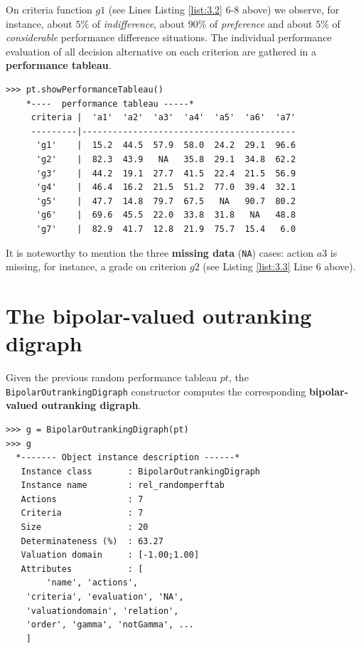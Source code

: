 On criteria function $g1$ (see Lines Listing \ref{list:3.2} 6-8 above) we observe, for instance, about $5\%$ of \emph{indifference}, about $90\%$ of \emph{preference} and about $5\%$ of \emph{considerable} performance difference situations. The individual performance evaluation of all decision alternative on each criterion are gathered in a {\bf performance tableau}.

\begin{lstlisting}[caption={Inspecting the performance table},label=list:3.3]
>>> pt.showPerformanceTableau()
    *----  performance tableau -----*
     criteria |  'a1'  'a2'  'a3'  'a4'  'a5'  'a6'  'a7'   
     ---------|------------------------------------------
      'g1'    |  15.2  44.5  57.9  58.0  24.2  29.1  96.6  
      'g2'    |  82.3  43.9   NA   35.8  29.1  34.8  62.2  
      'g3'    |  44.2  19.1  27.7  41.5  22.4  21.5  56.9  
      'g4'    |  46.4  16.2  21.5  51.2  77.0  39.4  32.1  
      'g5'    |  47.7  14.8  79.7  67.5   NA   90.7  80.2  
      'g6'    |  69.6  45.5  22.0  33.8  31.8   NA   48.8  
      'g7'    |  82.9  41.7  12.8  21.9  75.7  15.4   6.0  
\end{lstlisting}

It is noteworthy to mention the three {\bf missing data} (\texttt{NA}) cases: action $a3$ is missing, for instance, a grade on criterion $g2$ (see Listing \ref{list:3.3} Line 6 above).
    
\section{The bipolar-valued outranking digraph}
\label{sec:3.2}

Given the previous random performance tableau $pt$, the {\tt BipolarOutrankingDigraph} constructor computes the corresponding {\bf bipolar-valued outranking digraph}. 

\begin{lstlisting}[caption={Example of random bipolar-valued outranking digraph},label=list:3.4]
>>> g = BipolarOutrankingDigraph(pt)
>>> g
  *------- Object instance description ------*
   Instance class       : BipolarOutrankingDigraph
   Instance name        : rel_randomperftab
   Actions              : 7
   Criteria             : 7
   Size                 : 20
   Determinateness (%)  : 63.27
   Valuation domain     : [-1.00;1.00]
   Attributes           : [
        'name', 'actions', 
	'criteria', 'evaluation', 'NA',
	'valuationdomain', 'relation', 
	'order', 'gamma', 'notGamma', ...
	]
\end{lstlisting}

